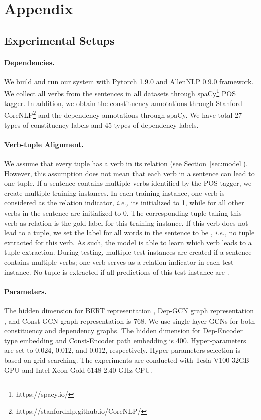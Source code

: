 \documentclass[11pt]{article}
\newcommand{\ie}{\emph{i.e.,}\xspace}
\begin{document}
\appendix

\section{Appendix}
\label{Sec:appendix}



\subsection{Experimental Setups}
\label{sec:expSetup}


\paragraph{Dependencies.} We build and run our system with Pytorch 1.9.0 and AllenNLP 0.9.0 framework. We collect all verbs from the sentences in all datasets through spaCy\footnote{https://spacy.io/} POS tagger.
In addition, we obtain the constituency annotations through Stanford CoreNLP\footnote{https://stanfordnlp.github.io/CoreNLP/} and the dependency annotations through spaCy. We have total 27 types of constituency labels and 45 types of dependency labels.

\paragraph{Verb-tuple Alignment.}
We assume that every tuple has a verb in its relation (see Section~\ref{sec:model}). However, this assumption does not mean that each verb in a sentence can lead to one tuple. 
If a sentence contains multiple verbs identified by the POS tagger, we create multiple training instances. In each training instance, one verb is considered as the relation indicator, \ie its  initialized to 1, while  for all other verbs in the sentence are initialized to 0. The corresponding tuple taking this verb as relation is the gold label for this training instance. If this verb does not lead to a tuple, we set the label for all words in the sentence to be , \ie no tuple extracted for this verb. As such, the model is able to learn which verb leads to a tuple extraction. During testing, multiple test instances are created if a sentence contains multiple verbs; one verb serves as a relation indicator in each test instance. No tuple is extracted if all predictions of this test instance are .


\paragraph{Parameters.}
The hidden dimension  for BERT representation , Dep-GCN graph representation , and Const-GCN graph representation  is 768. We use single-layer GCNs for both constituency and dependency graphs. The hidden dimension  for Dep-Encoder type embedding  and Const-Encoder path embedding  is 400. Hyper-parameters  are set to 0.024, 0.012, and 0.012, respectively. Hyper-parameters selection is based on grid searching. The experiments are conducted with Tesla V100 32GB GPU and Intel  Xeon Gold 6148 2.40 GHz CPU.
\end{document}
